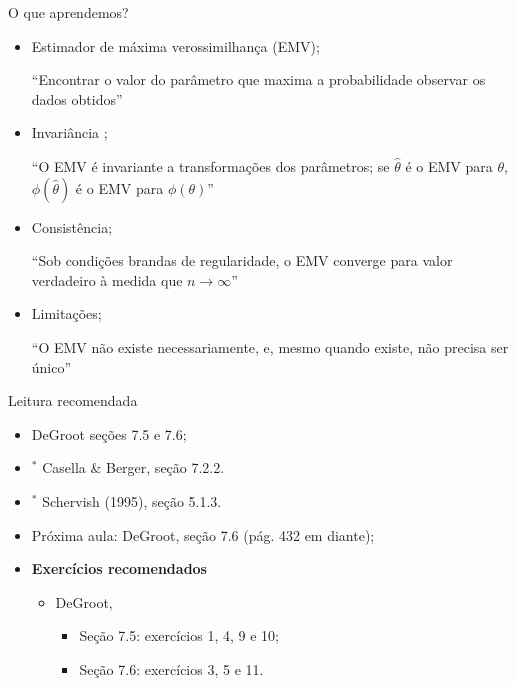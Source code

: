 \begin{frame}{O que aprendemos?}
\begin{itemize}
 \item[\faLightbulbO] Estimador de máxima verossimilhança (EMV);
 
   ``Encontrar o valor do parâmetro que maxima a probabilidade observar os dados obtidos''
   
  \item[\faLightbulbO] Invariância ;
  
  ``O EMV é invariante a transformações dos parâmetros; se $\hat{\theta}$ é o EMV para $\theta$, $\phi(\hat{\theta})$ é o EMV para $\phi(\theta)$''
  
    \item[\faLightbulbO] Consistência;
  
  ``Sob condições brandas de regularidade, o EMV converge para valor verdadeiro à medida que $n \to \infty$''
  
    \item[\faLightbulbO] Limitações;
  
  ``O EMV não existe necessariamente, e, mesmo quando existe, não precisa ser único''
  
  \end{itemize}
 \end{frame}

\begin{frame}{Leitura recomendada}
\begin{itemize}
 \item[\faBook] DeGroot seções 7.5 e 7.6;
 \item[\faBook] $^\ast$ Casella \& Berger, seção 7.2.2.
 \item[\faBook] $^\ast$ Schervish (1995), seção 5.1.3.
   \item[\faForward] Próxima aula: DeGroot, seção 7.6 (pág. 432 em diante);
 \item {\large\textbf{Exercícios recomendados}}
 \begin{itemize}
  \item[\faBookmark] DeGroot,
  \begin{itemize}
   \item Seção 7.5: exercícios  1, 4, 9 e 10;
   \item Seção 7.6: exercícios 3, 5 e 11.
  \end{itemize}   
  \end{itemize}
 \end{itemize} 
\end{frame}

